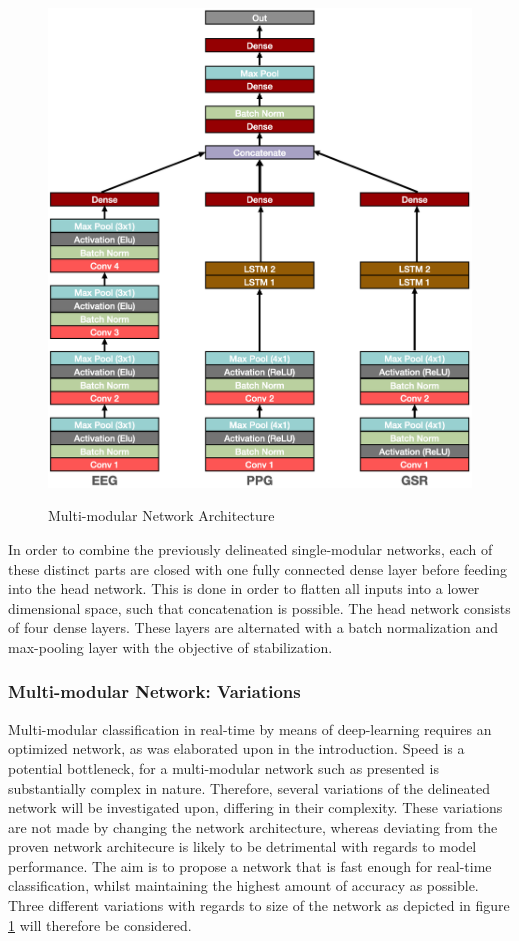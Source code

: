 \documentclass[12pt]{article}
\begin{document}
\begin{figure}
\caption{Multi-modular Network Architecture}
\bigskip
\includegraphics[scale=0.725]{multi_model_architecture}
\label{fig:multiarchitecture}
\end{figure}

In order to combine the previously delineated single-modular networks, each of these distinct parts are closed with one fully connected dense layer before feeding into the head network. This is done in order to flatten all inputs into a lower dimensional space, such that concatenation is possible. The head network consists of four dense layers. These layers are alternated with a batch normalization and max-pooling layer with the objective of stabilization. 

\subsubsection{Multi-modular Network: Variations}
Multi-modular classification in real-time by means of deep-learning requires an optimized network, as was elaborated upon in the introduction. Speed is a potential bottleneck, for a multi-modular network such as presented is substantially complex in nature. Therefore, several variations of the delineated network will be investigated upon, differing in their complexity. These variations are not made by changing the network architecture, whereas deviating from the proven network architecure is likely to be detrimental with regards to model performance. The aim is to propose a network that is fast enough for real-time classification, whilst maintaining the highest amount of accuracy as possible. Three different variations with regards to size of the network as depicted in figure \ref{fig:multiarchitecture} will therefore be considered.
\end{document}
